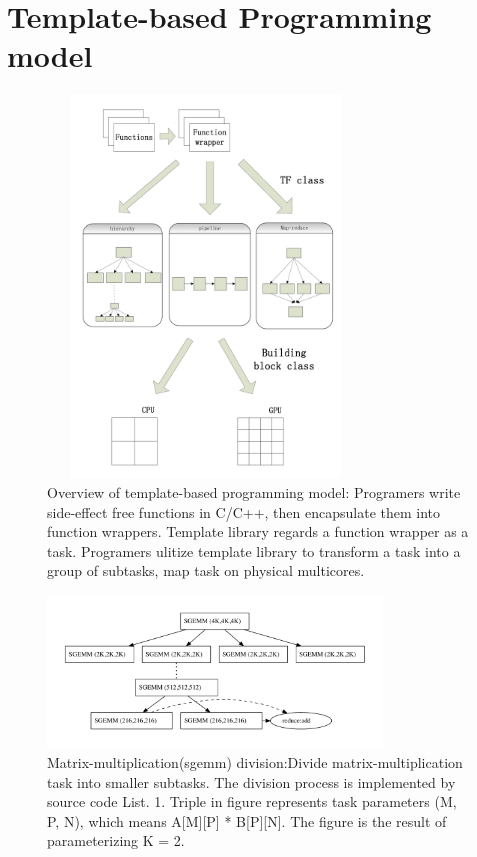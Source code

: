 \section{Template-based Programming model}\label{sec:model}

\begin{figure}[tp]
\includegraphics[width=3.3in, height=4.0in]{../overview}
\caption{Overview of template-based programming model: Programers
write side-effect free functions in C/C++, then encapsulate them into
function wrappers. Template library regards a function wrapper as
a task. Programers ulitize template library to transform a task into a
group of subtasks, map task on physical multicores.}\label{fig:overview}
\end{figure}

\hspace{-1ex}\begin{figure}[tp]
\includegraphics[width=3.5in]{../mmexample}
\caption{Matrix-multiplication(sgemm) division:Divide 
matrix-multiplication task into smaller subtasks. The division process
is implemented by source code List. 1. Triple in figure represents
task parameters (M, P, N), which means A[M][P] * B[P][N]. The figure
is the result of parameterizing K = 2. } \label{fig:mmexample}
\end{figure}


